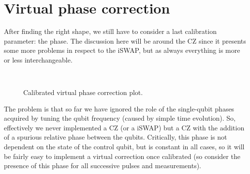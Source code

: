 
\section{Virtual phase correction}

After finding the right shape, we still have to consider a last calibration parameter: the phase.
The discussion here will be around the CZ since it presents some more problems in respect to the iSWAP, but as always everything is more or less interchangeable.

\begin{figure}[ht]
    \centering
    \\
    \caption{Calibrated virtual phase correction plot.}
    \label{fig:virtualphase}
\end{figure}

The problem is that so far we have ignored the role of the single-qubit phases acquired by tuning the qubit frequency (caused by simple time evolution). 
So, effectively we never implemented a CZ (or a iSWAP) but a CZ with the addition of a spurious relative phase between the qubits.
Critically, this phase is not dependent on the state of the control qubit, but is constant in all cases, so it will be fairly easy to implement a virtual correction once calibrated (so consider the presence of this phase for all successive pulses and measurements).

